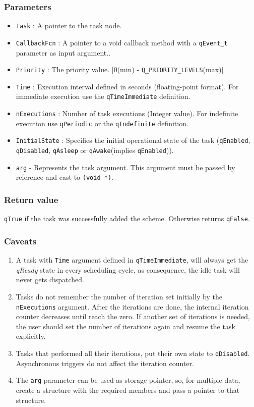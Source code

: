 \documentclass{article}
\begin{document}
\subsubsection*{Parameters}
\begin{itemize}
    \item \lstinline{Task} : A pointer to the task node. 
    \item \lstinline{CallbackFcn} : A pointer to a void callback method with a \lstinline{qEvent_t} parameter as input argument..
    \item \lstinline{Priority} : The priority value. [0(min) - \lstinline{Q_PRIORITY_LEVELS}(max)]
    \item \lstinline{Time} : Execution interval defined in seconds (floating-point format). For immediate execution use the  \lstinline{qTimeImmediate} definition. 
    \item \lstinline{nExecutions} : Number of task executions (Integer value). For indefinite execution  use \lstinline{qPeriodic} or the \lstinline{qIndefinite} definition. 
    \item \lstinline{InitialState} : Specifies the initial operational state of the task (\lstinline{qEnabled}, \lstinline{qDisabled}, \lstinline{qAsleep} or \lstinline{qAwake}(implies \lstinline{qEnabled})).
    \item \lstinline{arg} - Represents the task argument. This argument must be passed by reference and cast to \lstinline{(void *)}. 
\end{itemize}

\subsubsection*{Return value}
\lstinline{qTrue} if the task was successfully added the scheme. Otherwise returns \lstinline{qFalse}.

\subsubsection*{Caveats}
\begin{enumerate}
    \item A task with \lstinline{Time} argument defined in \lstinline{qTimeImmediate}, will always get the \textit{qReady} state in every scheduling cycle, as consequence, the idle task will never gets dispatched.
    \item Tasks do not remember the number of iteration set initially by the \lstinline{nExecutions} argument. After the iterations are done, the internal iteration counter decreases until reach the zero. If another set of iterations is needed, the user should set the number of iterations again and resume the task explicitly. 
    \item Tasks that performed all their iterations, put their own state to \lstinline{qDisabled}. Asynchronous triggers do not affect the iteration counter.
    \item The \lstinline{arg} parameter can be used as storage pointer, so, for multiple data, create a structure with the required members and pass a pointer to that structure.
\end{enumerate}
\end{document}
